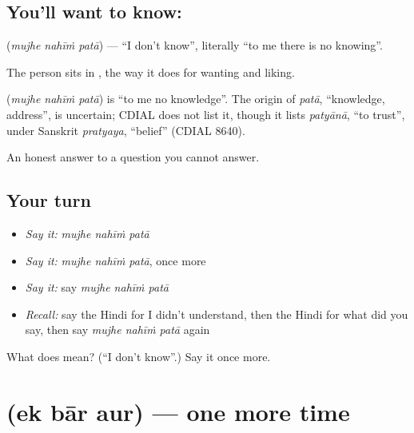 \subsection*{You'll want to know:   }
\textbf{  } (\emph{mujhe nahīṁ patā}) — \textquotedblleft{}I don't know\textquotedblright{}, literally \textquotedblleft{}to me there is no knowing\textquotedblright{}.

The person sits in \textbf{}, the way it does for wanting and liking.

\begin{cousinweb}
\textbf{  } (\emph{mujhe nahīṁ patā}) is \textquotedblleft{}to me no knowledge\textquotedblright{}. The origin of \emph{patā}, \textquotedblleft{}knowledge, address\textquotedblright{}, is uncertain; CDIAL does not list it, though it lists \emph{patyānā}, \textquotedblleft{}to trust\textquotedblright{}, under Sanskrit \emph{pratyaya}, \textquotedblleft{}belief\textquotedblright{} (CDIAL 8640).
\end{cousinweb}

\begin{grammarlens}[title={What you've built}]
An honest answer to a question you cannot answer.
\end{grammarlens}

\subsection*{Your turn}
\begin{itemize}
\raggedright
  \item \emph{Say it:} \emph{mujhe nahīṁ patā}
  \item \emph{Say it:} \emph{mujhe nahīṁ patā}, once more
  \item \emph{Say it:} say \emph{mujhe nahīṁ patā}
  \item \emph{Recall:} say the Hindi for I didn't understand, then the Hindi for what did you say, then say \emph{mujhe nahīṁ patā} again
\end{itemize}

\begin{tcolorbox}[breakable,colback=teal!4,colframe=teal!35!black,title={Before you move on}]
What does    mean? (\textquotedblleft{}I don't know\textquotedblright{}.) Say it once more.
\end{tcolorbox}
\section[\texorpdfstring{\hi{एक} \hi{बार} \hi{और} (ek bār aur)}{एक बार और (ek bār aur)}]{   (ek bār aur) — one more time}

